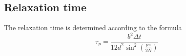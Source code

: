 \documentclass{paper}
\begin{document}
\subsection{Relaxation time}
The relaxation time is determined according to the formula
\begin{equation}
\tau_p = \frac{b^2\Delta t}{12d^2\sin^2(\frac{p\pi}{2N})}
\end{equation} 


\end{document}
